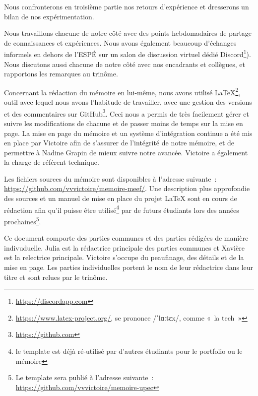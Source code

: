 Nous confronterons en troisième partie nos retours d'expérience et dresserons un bilan de nos expérimentation.

Nous travaillons chacune de notre côté avec des points hebdomadaires de partage de connaissances et expériences. Nous avons également beaucoup d’échanges informels en dehors de l’ESPÉ sur un salon de discussion virtuel dédié Discord\footnote{\url{https://discordapp.com}}). Nous discutons aussi chacune de notre côté avec nos encadrants et collègues, et rapportons les remarques au trinôme.

Concernant la rédaction du mémoire en lui-même, nous avons utilisé \LaTeX\footnote{\url{https://www.latex-project.org/}, se prononce /ˈlɑːtɛx/, comme « la tech »},
outil avec lequel nous avons l’habitude de travailler, avec une gestion des versions et des commentaires sur GitHub\footnote{\url{https://github.com}}. Ceci nous a permis de très facilement gérer et suivre les modifications de chacune et de passer moins de temps sur la mise en page. La mise en page du mémoire et un système d'intégration continue a été mis en place par Victoire afin de s'assurer de l'intégrité de notre mémoire, et de permettre à Nadine Grapin de mieux suivre notre avancée. Victoire a également la charge de référent technique.

Les fichiers sources du mémoire sont disponibles à l'adresse suivante : \url{https://github.com/vvvictoire/memoire-meef/}. Une description plus approfondie des sources et un manuel de mise en place du projet \LaTeX{} sont en cours de rédaction afin qu'il puisse être utilisé\footnote{le template est déjà ré-utilisé par d'autres étudiants pour le portfolio ou le mémoire} par de futurs étudiants lors des années prochaines\footnote{Le template sera publié à l'adresse
suivante : \url{https://github.com/vvvictoire/memoire-upec}}.

Ce document comporte des parties communes et des parties rédigées de manière indivuduelle. Julia est la rédactrice principale des parties communes et Xavière est la relectrice principale.
Victoire s'occupe du peaufinage, des détails et de la mise en page. Les parties individuelles portent le nom de leur rédactrice dans leur titre et sont relues par le trinôme.
